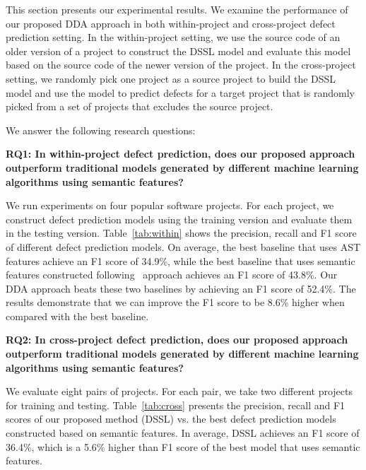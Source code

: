 This section presents our experimental results. We examine the performance of our proposed DDA approach in both within-project and cross-project defect prediction setting. In the within-project setting, we use the source code of an older version of a project to construct the DSSL model and evaluate this model based on the source code of the newer version of the project. In the cross-project setting, we randomly pick one project as a source project to build the DSSL model and use the model to predict defects for a target project that is randomly picked from a set of projects that excludes the source project.

We answer the following research questions: 

\textbf{RQ1: In within-project defect prediction, does our proposed approach outperform traditional models generated by different machine learning algorithms using semantic features?}

We run experiments on four popular software projects. For each project, we construct defect prediction models using the training version and evaluate them in the testing version. 
Table~\ref{tab:within} shows the precision, recall and F1 score of different defect prediction models. On average, the best baseline that uses AST features achieve an F1 score of 34.9\%, while the best baseline that uses semantic features constructed following~\cite{wang2016automatically} approach achieves an F1 score of 43.8\%. Our DDA approach beats these two baselines by achieving an F1 score of 52.4\%. The results demonstrate that we can improve the F1 score to be 8.6\% higher when compared with the best baseline. 


\textbf{RQ2: In cross-project defect prediction, does our proposed approach outperform traditional models generated by different machine learning algorithms using semantic features?}

We evaluate eight pairs of projects. For each pair, we take two different projects for training and testing. Table~\ref{tab:cross} presents the precision, recall and F1 scores of our proposed method (DSSL) vs. the best defect prediction models constructed based on semantic features. In average, DSSL achieves an F1 score of 36.4\%, which is a 5.6\% higher than F1 score of the best model that uses semantic features. 

